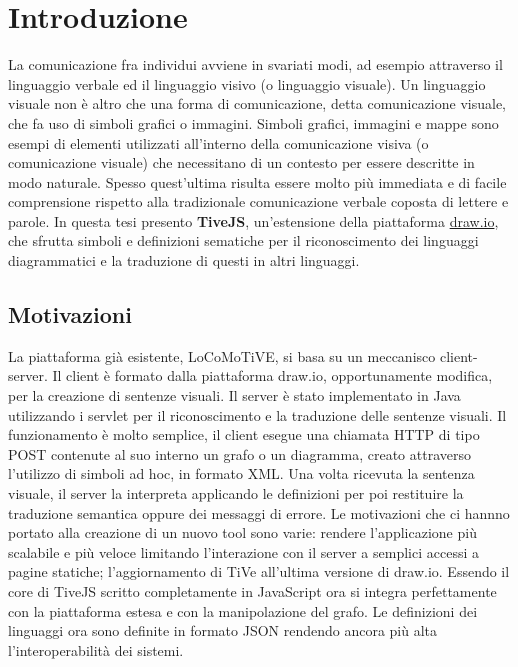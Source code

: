 ﻿\chapter{Introduzione}

    La comunicazione fra individui avviene in svariati modi, ad esempio attraverso il linguaggio verbale ed il linguaggio visivo (o linguaggio visuale).
    \newline
    Un linguaggio visuale non è altro che una forma di comunicazione, detta comunicazione visuale, che fa uso di simboli grafici o immagini. Simboli grafici, immagini e mappe sono esempi di elementi utilizzati all'interno della comunicazione visiva (o comunicazione visuale) che necessitano di un contesto per essere descritte in modo naturale. Spesso quest'ultima risulta essere molto più immediata e di facile comprensione rispetto alla tradizionale comunicazione verbale coposta di lettere e parole.
    \newline
    In questa tesi presento \textbf{TiveJS}, un'estensione della piattaforma \href{https://www.draw.io/}{draw.io}, che sfrutta  simboli e  definizioni sematiche per il riconoscimento dei linguaggi diagrammatici e la traduzione di questi in altri linguaggi.

    \section{Motivazioni}
        La piattaforma già esistente, LoCoMoTiVE, si basa su un meccanisco client-server.
        \newline
        Il client è formato dalla piattaforma draw.io, opportunamente modifica, per la creazione di sentenze visuali.
        Il server è stato implementato in Java utilizzando i servlet per il riconoscimento e la traduzione delle sentenze visuali.
        Il funzionamento è molto semplice, il client esegue una chiamata HTTP di tipo POST contenute al suo interno un grafo o un diagramma, creato attraverso l'utilizzo di simboli ad hoc, in formato XML. Una volta ricevuta la sentenza visuale, il server la interpreta applicando le definizioni per poi restituire la traduzione semantica oppure dei messaggi di errore.
        \newline
        Le motivazioni che ci hannno portato alla creazione di un nuovo tool sono varie: rendere l'applicazione più scalabile e più veloce limitando l'interazione con il server a semplici accessi a pagine statiche; l'aggiornamento di TiVe all'ultima versione di draw.io.
        Essendo il core di TiveJS scritto completamente in JavaScript ora si integra perfettamente con la piattaforma estesa e con la manipolazione del grafo.
        Le definizioni dei linguaggi ora sono definite in formato JSON rendendo ancora più alta l'interoperabilità dei sistemi. 

